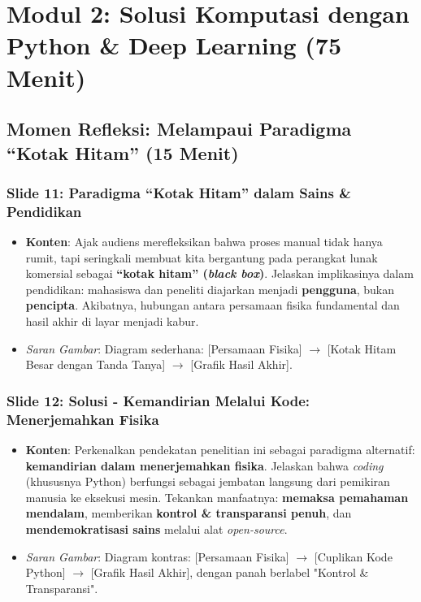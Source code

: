 \documentclass[12pt, a4paper]{article}
\begin{document}
\section{Modul 2: Solusi Komputasi dengan Python \& Deep Learning (75 Menit)}

\subsection{Momen Refleksi: Melampaui Paradigma ``Kotak Hitam'' (15 Menit)}

\subsubsection*{Slide 11: Paradigma ``Kotak Hitam'' dalam Sains \& Pendidikan}
\begin{itemize}
    \item \textbf{Konten}: Ajak audiens merefleksikan bahwa proses manual tidak hanya rumit, tapi seringkali membuat kita bergantung pada perangkat lunak komersial sebagai \textbf{``kotak hitam'' (\textit{black box})}. Jelaskan implikasinya dalam pendidikan: mahasiswa dan peneliti diajarkan menjadi \textbf{pengguna}, bukan \textbf{pencipta}. Akibatnya, hubungan antara persamaan fisika fundamental dan hasil akhir di layar menjadi kabur.
    \item \textit{Saran Gambar}: Diagram sederhana: [Persamaan Fisika] $\rightarrow$ [Kotak Hitam Besar dengan Tanda Tanya] $\rightarrow$ [Grafik Hasil Akhir].
\end{itemize}

\subsubsection*{Slide 12: Solusi - Kemandirian Melalui Kode: Menerjemahkan Fisika}
\begin{itemize}
    \item \textbf{Konten}: Perkenalkan pendekatan penelitian ini sebagai paradigma alternatif: \textbf{kemandirian dalam menerjemahkan fisika}. Jelaskan bahwa \textit{coding} (khususnya Python) berfungsi sebagai jembatan langsung dari pemikiran manusia ke eksekusi mesin. Tekankan manfaatnya: \textbf{memaksa pemahaman mendalam}, memberikan \textbf{kontrol \& transparansi penuh}, dan \textbf{mendemokratisasi sains} melalui alat \textit{open-source}.
    \item \textit{Saran Gambar}: Diagram kontras: [Persamaan Fisika] $\rightarrow$ [Cuplikan Kode Python] $\rightarrow$ [Grafik Hasil Akhir], dengan panah berlabel "Kontrol \& Transparansi".
\end{itemize}
\end{document}
